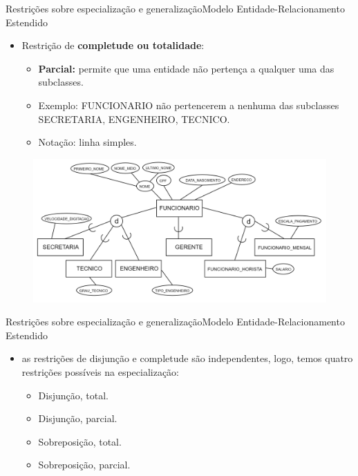 \documentclass[t]{beamer}
\begin{document}
\begin{ftst}{Restrições sobre especialização e generalização}{Modelo Entidade-Relacionamento Estendido}
\small
\begin{itemize}
    \item Restrição de \textbf{completude ou totalidade}:
    \begin{itemize}
        \item \textbf{Parcial:} permite que uma entidade não pertença a qualquer uma das subclasses.
        \item Exemplo: FUNCIONARIO não pertencerem a nenhuma das subclasses {SECRETARIA, ENGENHEIRO, TECNICO}.
        \item Notação: linha simples.
    \end{itemize}
\end{itemize}
\begin{figure}
    \centering
    \includegraphics[scale=0.1]{Figuras/02_1.png}
\end{figure}

\end{ftst}


\begin{ftst}{Restrições sobre especialização e generalização}{Modelo Entidade-Relacionamento Estendido}

\begin{itemize}
    \item as restrições de disjunção e completude são independentes, logo, temos quatro restrições possíveis na especialização:
    \begin{itemize}
        \item Disjunção, total.
        \item Disjunção, parcial.
        \item Sobreposição, total.
        \item Sobreposição, parcial.
    \end{itemize}
\end{itemize}
\end{ftst}
\end{document}
